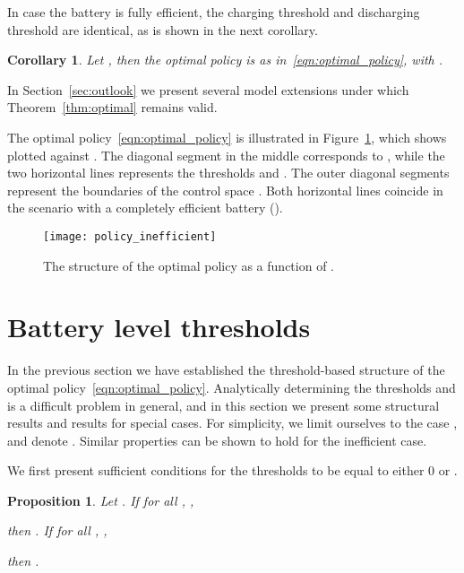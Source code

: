 \documentclass[journal]{IEEEtran}
\newcommand\1{\mathbf{1}}
\newtheorem{corollary}{Corollary}
\newtheorem{proposition}{Proposition}
\begin{document}
In case the battery is fully efficient, the charging threshold and discharging threshold are identical, as is shown in the next corollary.

\begin{corollary}\label{col:efficient}
Let , then the optimal policy is as in~\eqref{eqn:optimal_policy}, with .
\end{corollary}

In Section~\ref{sec:outlook} we present several model extensions under which Theorem~\ref{thm:optimal} remains valid.


The optimal policy~\eqref{eqn:optimal_policy} is illustrated in Figure~\ref{fig:policy}, which shows  plotted against . The diagonal segment in the middle corresponds to , while the two horizontal lines represents the thresholds  and . The outer diagonal segments represent the boundaries of the control space . Both horizontal lines coincide in the scenario with a completely efficient battery ().

\begin{figure}[h]
    \begin{center}
        \texttt{[image: policy\_inefficient]}
    \end{center}
    \caption{The structure of the optimal policy  as a function of .}
    \label{fig:policy}
\end{figure}



\section{Battery level thresholds}\label{sec:thresholds}

In the previous section we have established the threshold-based structure of the optimal policy~\eqref{eqn:optimal_policy}. Analytically determining the thresholds  and  is a difficult problem in general, and in this section we present some structural results and results for special cases. For simplicity, we limit ourselves to the case , and denote . Similar properties can be shown to hold for the inefficient case.

We first present sufficient conditions for the thresholds to be equal to either 0 or .

\begin{proposition}\label{pro:sufficient_conditions}
Let . If for all , , 

then . If for all , , 

then .
\end{proposition}
\end{document}
